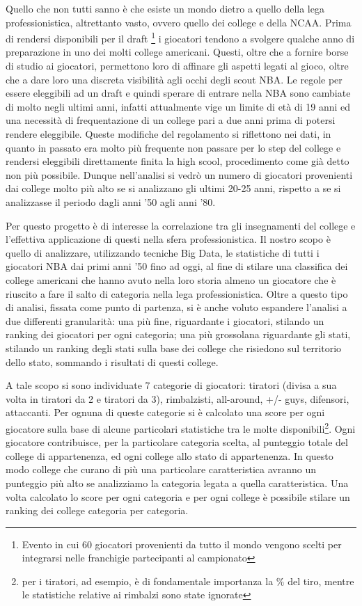 \documentclass[10pt,a4paper,twocolumn]{article}
\begin{document}
Quello che non tutti sanno è che esiste un mondo dietro a quello della lega professionistica, altrettanto vasto, ovvero quello dei college e della NCAA. Prima di rendersi disponibili per il draft \footnote{Evento in cui 60 giocatori provenienti da tutto il mondo vengono scelti per integrarsi nelle franchigie partecipanti al campionato} i giocatori tendono a svolgere qualche anno di preparazione in uno dei molti college americani. Questi, oltre che a fornire borse di studio ai giocatori, permettono loro di affinare gli aspetti legati al gioco, oltre che a dare loro una discreta visibilità agli occhi degli scout NBA. Le regole per essere eleggibili ad un draft e quindi sperare di entrare nella NBA sono cambiate di molto negli ultimi anni, infatti attualmente vige un limite di età di 19 anni ed una necessità di frequentazione di un college pari a due anni prima di potersi rendere eleggibile. Queste modifiche del regolamento si riflettono nei dati, in quanto in passato era molto più frequente non passare per lo step del college e rendersi eleggibili direttamente finita la high scool, procedimento come già detto non più possibile. Dunque nell'analisi si vedrò un numero di giocatori provenienti dai college molto più alto se si analizzano gli ultimi 20-25 anni, rispetto a se si analizzasse il periodo dagli anni '50 agli anni '80.

Per questo progetto è di interesse la correlazione tra gli insegnamenti del college e l'effettiva applicazione di questi nella sfera professionistica. Il nostro scopo è quello di analizzare, utilizzando tecniche Big Data, le statistiche di tutti i giocatori NBA dai primi anni '50 fino ad oggi, al fine di stilare una classifica dei college americani che hanno avuto nella loro storia almeno un giocatore che è riuscito a fare il salto di categoria nella lega professionistica. Oltre a questo tipo di analisi, fissata come punto di partenza, si è anche voluto espandere l'analisi a due differenti granularità: una più fine, riguardante i giocatori, stilando un ranking dei giocatori per ogni categoria; una più grossolana riguardante gli stati, stilando un ranking degli stati sulla base dei college che risiedono sul territorio dello stato, sommando i risultati di questi college. 

A tale scopo si sono individuate 7 categorie di giocatori: tiratori (divisa a sua volta in tiratori da 2 e tiratori da 3), rimbalzisti, all-around, +/- guys, difensori, attaccanti. Per ognuna di queste categorie si è calcolato una score per ogni giocatore sulla base di alcune particolari statistiche tra le molte disponibili\footnote{per i tiratori, ad esempio, è di fondamentale importanza la \% del tiro, mentre le statistiche relative ai rimbalzi sono state ignorate}. Ogni giocatore contribuisce, per la particolare categoria scelta, al punteggio totale del college di appartenenza, ed ogni college allo stato di appartenenza. In questo modo college che curano di più una particolare caratteristica avranno un punteggio più alto se analizziamo la categoria legata a quella caratteristica. Una volta calcolato lo score per ogni categoria e per ogni college è possibile stilare un ranking dei college categoria per categoria.
\end{document}
